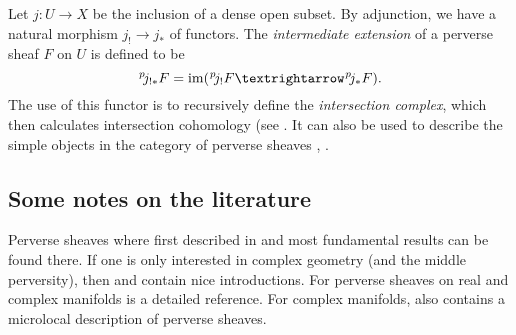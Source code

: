 \documentclass[english]{short-notes}
\begin{document}
Let $j\colon U → X$ be the inclusion of a dense open subset.
By adjunction, we have a natural morphism $j_! → j_*$ of functors.
The \emph{intermediate extension} of a perverse sheaf $F$ on $U$ is defined to be
\[
\perv j_{!*} F = \im(\perv j_! F → \perv j_*F).
\]
The use of this functor is to recursively define the \emph{intersection complex}, which then calculates intersection cohomology (see \cite[Section~8.2]{HottaTakeuchiTanisaki:2008:DModulesPerverseSheavesRepresentationTheory}.
It can also be used to describe the simple objects in the category of perverse sheaves \cite[Corollary~8.2.10]{HottaTakeuchiTanisaki:2008:DModulesPerverseSheavesRepresentationTheory}, \cite[Lemma~13.26]{PetersSteenbrink:2008:MixedHodgeStructures}.

\subsection{Some notes on the literature}

Perverse sheaves where first described in \cite{BeilinsonBernsteinDeligne:1982:FaisceauxPervers} and most fundamental results can be found there.
If one is only interested in complex geometry (and the middle perversity), then \cite{HottaTakeuchiTanisaki:2008:DModulesPerverseSheavesRepresentationTheory} and \cite{PetersSteenbrink:2008:MixedHodgeStructures} contain nice introductions.
For perverse sheaves on real and complex manifolds \cite{KashiwaraSchapira:1994:SheavesOnManifolds} is a detailed reference.
For complex manifolds, \cite{KashiwaraSchapira:1994:SheavesOnManifolds} also contains a microlocal description of perverse sheaves.

\printbibliography
\end{document}
